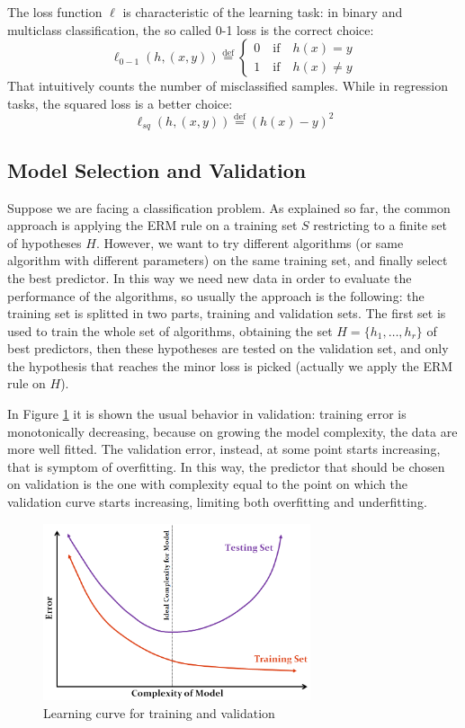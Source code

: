 The loss function $\ell$ is characteristic of the learning task: in binary and multiclass classification, the so called 0-1 loss is the correct choice:
\[\ell_{0-1}(h, (x,y)) \stackrel{\text{def}}{=} 
	\begin{cases}
		0 \quad \textrm{if} \quad  h(x) = y\\
		1 \quad \textrm{if} \quad  h(x) \neq y
	\end{cases}\]
That intuitively counts the number of misclassified samples. While in regression tasks, the squared loss is a better choice:
\[\ell_{sq}(h,(x,y)) \stackrel{\text{def}}{=} (h(x)-y)^2\]




\subsection{Model Selection and Validation}
Suppose we are facing a classification problem. As explained so far, the common approach is applying the \ac{ERM} rule on a training set $S$ restricting to a finite set of hypotheses $H$. However, we want to try different algorithms (or same algorithm with different parameters) on the same training set, and finally select the best predictor. In this way we need new data in order to evaluate the performance of the algorithms, so usually the approach is the following: the training set is splitted in two parts, training and validation sets. The first set is used to train the whole set of algorithms, obtaining the set $H = \{h_1, \dots, h_r\}$ of best predictors, then these hypotheses are tested on the validation set, and only the hypothesis that reaches the minor loss is picked (actually we apply the \ac{ERM} rule on $H$).

In Figure \ref{fig:valid-curve} it is shown the usual behavior in validation: training error is monotonically decreasing, because on growing the model complexity, the data are more well fitted. The validation error, instead, at some point starts increasing, that is symptom of overfitting. In this way, the predictor that should be chosen on validation is the one with complexity equal to the point on which the validation curve starts increasing, limiting both overfitting and underfitting.
\begin{figure}
	\centering
	\includegraphics[width=0.7\textwidth]{figures/validation-lern-curve.png}
	\caption{Learning curve for training and validation}
	\label{fig:valid-curve}
\end{figure}

